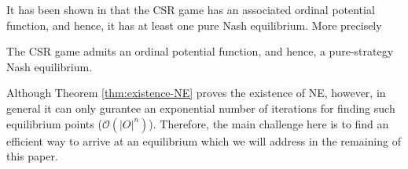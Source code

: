 It has been shown in \cite{gopalakrishnan2012cache} that the CSR game has an associated ordinal potential function, and hence, it has at least one pure Nash equilibrium. More precisely

\smallskip
\begin{theorem}\label{thm:existence-NE}
The CSR game admits an ordinal potential function, and hence, a pure-strategy Nash equilibrium.
\end{theorem}

Although Theorem \ref{thm:existence-NE} proves the existence of NE, however, in general it can only gurantee an exponential number of iterations for finding such equilibrium points ($\mathcal{O}(|O|^n)$). Therefore, the main challenge here is to find an efficient way to arrive at an equilibrium which we will address in the remaining of this paper.
